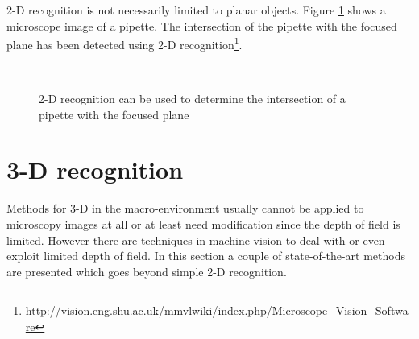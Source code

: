 \documentclass[a4paper,12pt]{book}
\begin{document}
2-D recognition is not necessarily limited to planar objects. Figure
\ref{fig:pipette} shows a microscope image of a pipette. The intersection
of the pipette with the focused plane has been detected using 2-D
recognition\footnote{\url{http://vision.eng.shu.ac.uk/mmvlwiki/index.php/Microscope_Vision_Software}}. %
\begin{figure}[htbp]
   \begin{center}
     \\
     \caption{2-D recognition can be used to determine the intersection of a
       pipette with the focused plane\label{fig:pipette}}
   \end{center}
\end{figure}

\section{3-D recognition}
Methods for 3-D in the macro-environment usually cannot be applied to
microscopy images at all or at least need modification since the depth of
field is limited. However there are techniques in machine vision to deal with
or even exploit limited depth of field. In this section a couple of
state-of-the-art methods are presented which goes beyond simple 2-D
recognition.
\end{document}
